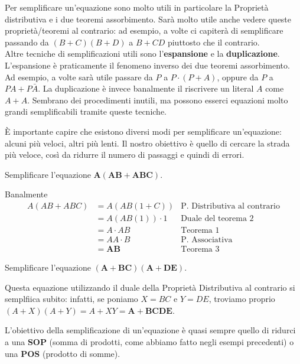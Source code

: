 \documentclass[11pt, a4paper, titlepage, oneside]{scrbook}
\begin{document}
Per semplificare un'equazione sono molto utili in particolare la Proprietà distributiva e i due teoremi assorbimento. Sarà molto utile anche vedere queste proprietà/teoremi al contrario: ad esempio, a volte ci capiterà di  semplificare passando da $(B + C) (B + D)$ a $B + CD$ piuttosto che il contrario. \\
Altre tecniche di semplificazioni utili sono l'\textbf{espansione} e la \textbf{duplicazione}. L'espansione è praticamente il fenomeno inverso dei due teoremi assorbimento. Ad esempio, a volte sarà utile passare da $P$ a $P \cdot (P + A)$, oppure da $P$ a $PA + P \bar{A}$. La duplicazione è invece banalmente il riscrivere un literal $A$ come $A + A$. Sembrano dei procedimenti inutili, ma possono esserci equazioni molto grandi semplificabili tramite queste tecniche. 

È importante capire che esistono diversi modi per semplificare un'equazione: alcuni più veloci, altri più lenti. Il nostro obiettivo è quello di cercare la strada più veloce, così da ridurre il numero di passaggi e quindi di errori.

\Esempi \nopagebreak

Semplificare l'equazione $\bm{A(AB + ABC)}$. \nopagebreak

Banalmente
\begin{align*}
A(AB + ABC) &=  A(AB(1+C)) &\text{P. Distributiva al contrario}\\
 &= A(AB(1))\cdot 1 &\text{Duale del teorema 2} \\
 &= A \cdot AB &\text{Teorema 1} \\
 &= AA \cdot B &\text{P. Associativa} \\
 &= \bm{AB} & \text{Teorema 3} 
\end{align*}

\Separatore

Semplificare l'equazione $\bm{(A + BC)(A + DE)}$. \nopagebreak

Questa equazione utilizzando il duale della Proprietà Distributiva al contrario si semplfiica subito: infatti, se poniamo $X = BC$ e $Y = DE$, troviamo proprio $(A + X)(A + Y) = A + XY = \bm{A + BCDE}$.

\begin{Proposizione}
\label{propos-obiettivo-semplificazione}
L'obiettivo della semplificazione di un'equazione è quasi sempre quello di ridurci a una \textbf{SOP} (somma di prodotti, come abbiamo fatto negli esempi precedenti) o una \textbf{POS} (prodotto di somme).
\end{Proposizione}
\end{document}
